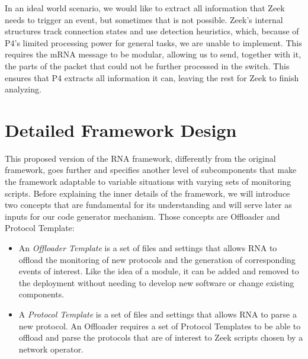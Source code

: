 In an ideal world scenario, we would like to extract all information that Zeek needs to trigger an event, but sometimes that is not possible. Zeek's internal structures track connection states and use detection heuristics, which, because of P4's limited processing power for general tasks, we are unable to implement. This requires the mRNA message to be modular, allowing us to send, together with it, the parts of the packet that could not be further processed in the switch. This ensures that P4 extracts all information it can, leaving the rest for Zeek to finish analyzing.

\section{Detailed Framework Design}
\label{sec:rna:detailed_design}

This proposed version of the RNA framework, differently from the original framework, goes further and specifies another level of subcomponents that make the framework adaptable to variable situations with varying sets of monitoring scripts. Before explaining the inner details of the framework, we will introduce two concepts that are fundamental for its understanding and will serve later as inputs for our code generator mechanism. Those concepts are Offloader and Protocol Template:

\begin{itemize}
    \item An \textit{Offloader Template} is a set of files and settings that allows RNA to offload the monitoring of new protocols and the generation of corresponding events of interest. Like the idea of a module, it can be added and removed to the deployment without needing to develop new software or change existing components.

    \item A \textit{Protocol Template} is a set of files and settings that allows RNA to parse a new protocol. An Offloader requires a set of Protocol Templates to be able to offload and parse the protocols that are of interest to Zeek scripts chosen by a network operator.
\end{itemize}

